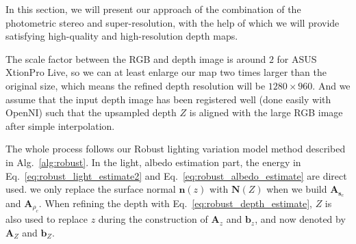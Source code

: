 In this section, we will present our approach of the combination of the photometric stereo and super-resolution, with the help of which we will provide satisfying high-quality and high-resolution depth maps. 

The scale factor between the RGB and depth image is around $2$ for ASUS XtionPro Live, so we can at least enlarge our map two times larger than the original size, which means the refined depth resolution will be $1280\times960$.
 And we assume that the input depth image has been registered well (done easily with OpenNI) such that the upsampled depth $Z$ is aligned with the large RGB image after simple interpolation.

The whole process follows our Robust lighting variation model method described in Alg.~\ref{alg:robust}.
In the light, albedo estimation part, the energy in Eq.~\ref{eq:robust_light_estimate2} and Eq.~\ref{eq:robust_albedo_estimate} are direct used. we only replace the surface normal $\mathbf{n}(z)$ with $\mathbf{N}(Z)$ when we build $\mathbf{A}_{\mathbf{s}_c}$ and $\mathbf{A}_{\rho_c}$. 
When refining the depth with Eq.~\ref{eq:robust_depth_estimate}, $Z$ is also used to replace $z$ during the construction of $\mathbf{A}_z$ and $\mathbf{b}_z$, and now denoted by $\mathbf{A}_Z$ and $\mathbf{b}_Z$.
 
